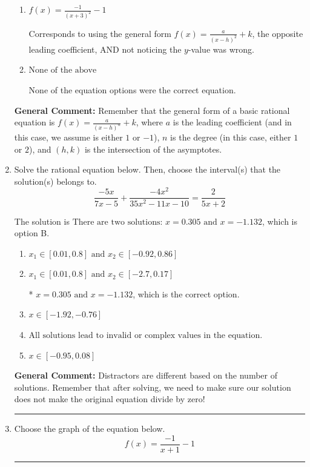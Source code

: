 \documentclass{extbook}[14pt]
\newcommand{\litem}[1]{\item #1

\rule{\textwidth}{0.4pt}}
\begin{document}
\begin{enumerate}
{\begin{enumerate}[label=\Alph*.]
Corresponds to thinking the graph was a shifted version of $\frac{1}{x}$, using the general form $f(x) = \frac{a}{(x-h)^2}+k$, the opposite leading coefficient, AND not noticing the $y$-value was wrong.
\item \( f(x) = \frac{-1}{(x + 3)^2} - 1 \)

Corresponds to using the general form $f(x) = \frac{a}{(x-h)^2}+k$, the opposite leading coefficient, AND not noticing the $y$-value was wrong.
\item \( \text{None of the above} \)

None of the equation options were the correct equation.
\end{enumerate}

\textbf{General Comment:} Remember that the general form of a basic rational equation is $ f(x) = \frac{a}{(x-h)^n} + k$, where $a$ is the leading coefficient (and in this case, we assume is either $1$ or $-1$), $n$ is the degree (in this case, either $1$ or $2$), and $(h, k)$ is the intersection of the asymptotes.
}
\litem{
Solve the rational equation below. Then, choose the interval(s) that the solution(s) belongs to.
\[ \frac{-5x}{7x -5} + \frac{-4x^{2}}{35x^{2} -11 x -10} = \frac{2}{5x + 2} \]

The solution is \( \text{There are two solutions: } x = 0.305 \text{ and } x = -1.132 \), which is option B.\begin{enumerate}[label=\Alph*.]
\item \( x_1 \in [0.01, 0.8] \text{ and } x_2 \in [-0.92,0.86] \)


\item \( x_1 \in [0.01, 0.8] \text{ and } x_2 \in [-2.7,0.17] \)

* $x = 0.305 \text{ and } x = -1.132$, which is the correct option.
\item \( x \in [-1.92,-0.76] \)


\item \( \text{All solutions lead to invalid or complex values in the equation.} \)


\item \( x \in [-0.95,0.08] \)


\end{enumerate}

\textbf{General Comment:} Distractors are different based on the number of solutions. Remember that after solving, we need to make sure our solution does not make the original equation divide by zero!
}
\litem{
Choose the graph of the equation below.
\[ f(x) = \frac{-1}{x + 1} - 1 \]

}
\end{enumerate}
\end{document}
